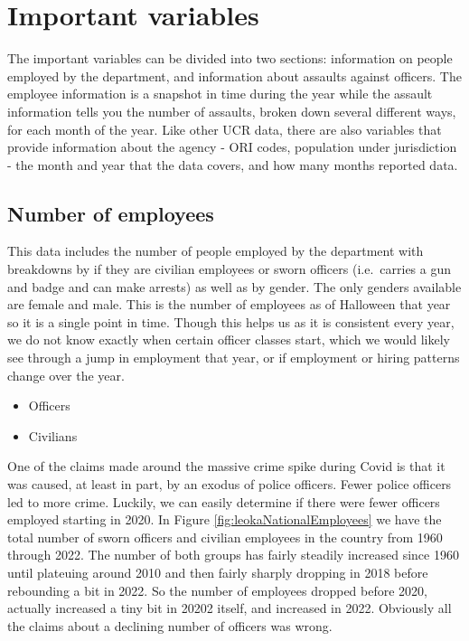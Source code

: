 \documentclass[
]{krantz}
\providecommand{\tightlist}{%
  \setlength{\itemsep}{0pt}\setlength{\parskip}{0pt}}
\begin{document}
\section{Important variables}\label{important-variables-4}

The important variables can be divided into two sections:
information on people employed by the department, and
information about assaults against officers. The employee
information is a snapshot in time during the year while the
assault information tells you the number of assaults, broken
down several different ways, for each month of the year.
Like other UCR data, there are also variables that provide
information about the agency - ORI codes, population under
jurisdiction - the month and year that the data covers, and
how many months reported data.

\subsection{Number of employees}\label{number-of-employees}

This data includes the number of people employed by the
department with breakdowns by if they are civilian employees
or sworn officers (i.e.~carries a gun and badge and can make
arrests) as well as by gender. The only genders available
are female and male. This is the number of employees as of
Halloween that year so it is a single point in time. Though
this helps us as it is consistent every year, we do not know
exactly when certain officer classes start, which we would
likely see through a jump in employment that year, or if
employment or hiring patterns change over the year.

\begin{itemize}
\tightlist
\item
  Officers
\item
  Civilians
\end{itemize}

One of the claims made around the massive crime spike during
Covid is that it was caused, at least in part, by an exodus
of police officers. Fewer police officers led to more crime.
Luckily, we can easily determine if there were fewer
officers employed starting in 2020. In Figure
\ref{fig:leokaNationalEmployees} we have the total number of
sworn officers and civilian employees in the country from
1960 through 2022. The number of both groups has fairly
steadily increased since 1960 until plateuing around 2010
and then fairly sharply dropping in 2018 before rebounding a
bit in 2022. So the number of employees dropped before 2020,
actually increased a tiny bit in 20202 itself, and increased
in 2022. Obviously all the claims about a declining number
of officers was wrong.
\end{document}
